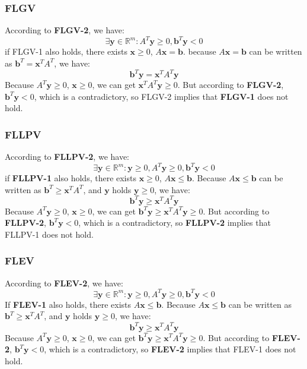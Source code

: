 \subsubsection*{FLGV}
According to \textbf{FLGV-2}, we have:
\[\exists \textbf{y} \in \mathbb{R}^{m}: A^{T}\textbf{y} \geq 0, \textbf{b}^{T}\textbf{y} < 0 \]
if FLGV-1 also holds, there exists $\textbf{x} \geq 0$, $A\textbf{x}=\textbf{b}$.
\noindent
because $A\textbf{x}=\textbf{b}$ can be written as $\textbf{b}^{T} = \textbf{x}^{T}A^{T}$, we have:
\[\textbf{b}^{T}\textbf{y}=\textbf{x}^{T}A^{T}\textbf{y}\]
Because $A^{T}\textbf{y} \geq 0$, $\textbf{x} \geq 0$, we can get $\textbf{x}^{T}A^{T}\textbf{y} \geq 0$. But according to \textbf{FLGV-2}, $\textbf{b}^{T}\textbf{y} < 0$, which is a contradictory, so FLGV-2 implies that \textbf{FLGV-1} does not hold.
\subsubsection*{FLLPV}
According to \textbf{FLLPV-2}, we have:
\[\exists \textbf{y} \in \mathbb{R}^{m}: \textbf{y} \geq 0, A^{T}\textbf{y} \geq 0, \textbf{b}^{T}\textbf{y} < 0 \]
if \textbf{FLLPV-1} also holds, there exists $\textbf{x} \geq 0$, $A\textbf{x} \leq \textbf{b}$. Because $A\textbf{x} \leq \textbf{b}$ can be written as $\textbf{b}^{T} \geq \textbf{x}^{T}A^{T}$, and $\textbf{y}$ holds $\textbf{y} \geq 0$, we have:
\[\textbf{b}^{T}\textbf{y} \geq \textbf{x}^{T}A^{T}\textbf{y}\]
Because $A^{T}\textbf{y} \geq 0$, $\textbf{x} \geq 0$, we can get $\textbf{b}^{T}\textbf{y} \geq \textbf{x}^{T}A^{T}\textbf{y} \geq 0$.
But according to \textbf{FLLPV-2}, $\textbf{b}^{T}\textbf{y} < 0$, which is a contradictory, so \textbf{FLLPV-2} implies that FLLPV-1 does not hold.
\subsubsection*{FLEV}
According to \textbf{FLEV-2}, we have:
\[\exists \textbf{y} \in \mathbb{R}^{m}: \textbf{y} \geq 0, A^{T}\textbf{y} \geq 0, \textbf{b}^{T}\textbf{y} < 0 \]
If \textbf{FLEV-1} also holds, there exists $A\textbf{x} \leq \textbf{b}$.
Because $A\textbf{x} \leq \textbf{b}$ can be written as $\textbf{b}^{T} \geq \textbf{x}^{T}A^{T}$, and $\textbf{y}$ holds $\textbf{y} \geq 0$, we have:
\[\textbf{b}^{T}\textbf{y} \geq \textbf{x}^{T}A^{T}\textbf{y}\]
Because $A^{T}\textbf{y} \geq 0$, $\textbf{x} \geq 0$, we can get $\textbf{b}^{T}\textbf{y} \geq \textbf{x}^{T}A^{T}\textbf{y} \geq 0$.
But according to \textbf{FLEV-2}, $\textbf{b}^{T}\textbf{y} < 0$, which is a contradictory, so \textbf{FLEV-2} implies that FLEV-1 does not hold.
